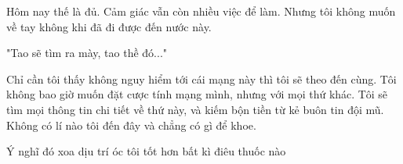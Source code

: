 Hôm nay thế là đủ. Cảm giác vẫn còn nhiều việc để làm. Nhưng tôi không muốn về tay không khi đã đi được đến nước này.

"Tao sẽ tìm ra mày, tao thề đó..."

Chỉ cần tôi thấy không nguy hiểm tới cái mạng này thì tôi sẽ theo đến cùng. Tôi không bao giờ muốn đặt cược tính mạng mình, nhưng với mọi thứ khác. Tôi sẽ tìm mọi thông tin chi tiết về thứ này, và kiếm bộn tiền từ kẻ buôn tin đội mũ. Không có lí nào tôi đến đây và chẳng có gì để khoe.

Ý nghĩ đó xoa dịu trí óc tôi tốt hơn bất kì điêu thuốc nào \\








